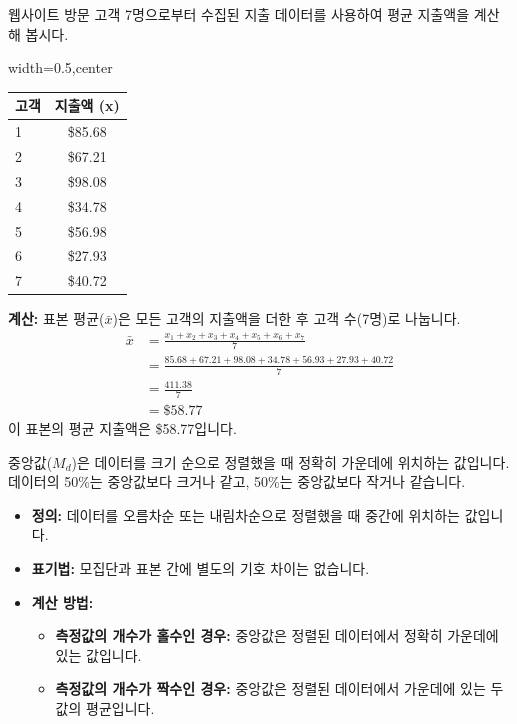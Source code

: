 \documentclass[11pt,a4paper]{article}
\theoremstyle{definition}
\begin{document}
\begin{examplebox}[title=예시: 고객 평균 지출액]
웹사이트 방문 고객 7명으로부터 수집된 지출 데이터를 사용하여 평균 지출액을 계산해 봅시다.

\begin{adjustbox}{width=0.5\textwidth,center}
\begin{tabular}{lc}
\toprule
\textbf{고객} & \textbf{지출액 (x)} \\
\midrule
1 & \$85.68 \\
2 & \$67.21 \\
3 & \$98.08 \\
4 & \$34.78 \\
5 & \$56.98 \\
6 & \$27.93 \\
7 & \$40.72 \\
\bottomrule
\end{tabular}
\end{adjustbox}
\label{tab:customer_spending}

\textbf{계산:}
표본 평균($\bar{x}$)은 모든 고객의 지출액을 더한 후 고객 수(7명)로 나눕니다.
\begin{align*}
    \bar{x} &= \frac{x_1+x_2+x_3+x_4+x_5+x_6+x_7}{7} \\
    &= \frac{85.68 + 67.21 + 98.08 + 34.78 + 56.93 + 27.93 + 40.72}{7} \\
    &= \frac{411.38}{7} \\
    &= \$58.77
\end{align*}
이 표본의 평균 지출액은 \$58.77입니다.
\end{examplebox}

\begin{definitionbox}[title=중앙값 (Median)]
중앙값($M_d$)은 데이터를 크기 순으로 정렬했을 때 정확히 가운데에 위치하는 값입니다.
데이터의 50\%는 중앙값보다 크거나 같고, 50\%는 중앙값보다 작거나 같습니다.

\begin{itemize}
    \item \textbf{정의:} 데이터를 오름차순 또는 내림차순으로 정렬했을 때 중간에 위치하는 값입니다.
    \item \textbf{표기법:} 모집단과 표본 간에 별도의 기호 차이는 없습니다.
    \item \textbf{계산 방법:}
    \begin{itemize}
        \item \textbf{측정값의 개수가 홀수인 경우:} 중앙값은 정렬된 데이터에서 정확히 가운데에 있는 값입니다.
        \item \textbf{측정값의 개수가 짝수인 경우:} 중앙값은 정렬된 데이터에서 가운데에 있는 두 값의 평균입니다.
    \end{itemize}
\end{itemize}
\end{definitionbox}
\end{document}
